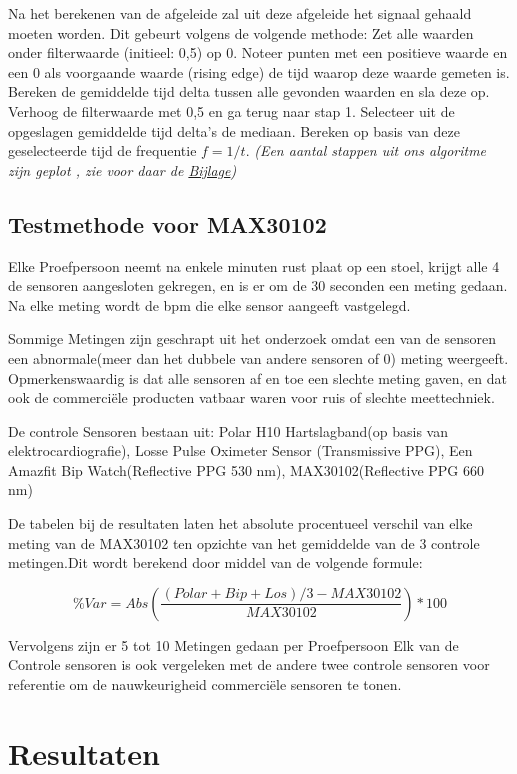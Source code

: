 \documentclass[11pt]{article}
\begin{document}
Na het berekenen van de afgeleide zal uit deze afgeleide het signaal gehaald moeten worden.
Dit gebeurt volgens de volgende methode:
Zet alle waarden onder filterwaarde (initieel: 0,5) op 0.
Noteer punten met een positieve waarde en een 0 als voorgaande waarde (rising edge) de tijd waarop deze waarde gemeten is.
Bereken de gemiddelde tijd delta tussen alle gevonden waarden en sla deze op.
Verhoog de filterwaarde met 0,5 en ga terug naar stap 1.
Selecteer uit de opgeslagen gemiddelde tijd delta’s de mediaan.
Bereken op basis van deze geselecteerde tijd de frequentie \(f = 1 / t\).
\emph{(Een aantal stappen uit ons algoritme zijn geplot , zie voor daar de \hyperref[sec:bijlagen]{Bijlage})}


\subsection{Testmethode voor MAX30102}
Elke Proefpersoon neemt na enkele minuten rust plaat op een stoel, krijgt alle 4 de sensoren aangesloten gekregen, en is er om de 30 seconden een meting gedaan. Na elke meting wordt de bpm die elke sensor aangeeft vastgelegd.

Sommige Metingen zijn geschrapt uit het onderzoek omdat een van de sensoren een abnormale(meer dan het dubbele van andere sensoren of 0) meting weergeeft. Opmerkenswaardig is dat alle sensoren af en toe een slechte meting gaven, en dat ook de commerciële producten vatbaar waren voor ruis of slechte meettechniek.

De controle Sensoren bestaan uit: Polar H10 Hartslagband(op basis van elektrocardiografie), Losse Pulse Oximeter Sensor (Transmissive PPG), Een Amazfit Bip Watch(Reflective PPG 530 nm), MAX30102(Reflective PPG 660 nm)

De tabelen bij de resultaten laten het absolute procentueel verschil van elke meting van de MAX30102 ten opzichte van het gemiddelde van de 3 controle metingen.Dit wordt berekend door middel van de volgende formule:

\[\% Var =Abs(\frac{(Polar + Bip+ Los)/3-MAX30102}{MAX30102})*100 \]

Vervolgens zijn er 5 tot 10 Metingen gedaan per Proefpersoon
Elk van de Controle sensoren is ook vergeleken met de andere twee controle sensoren voor referentie om de nauwkeurigheid commerciële sensoren te tonen.

    \section{Resultaten}\label{sec:resultaten}
\end{document}
